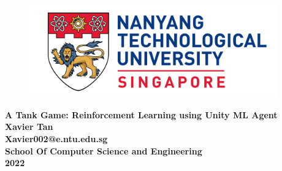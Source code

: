 \begin{titlepage}
\begin{figure}[!t]
\centering
\includegraphics[width = 4.2in]{Title/logo.png}
\caption*{}
\end{figure}

\centering
\LARGE{\textbf{A Tank Game: Reinforcement Learning using Unity ML Agent }}\\[2.5in]

\large{\textbf{Xavier Tan}}\\
\large{\textbf{Xavier002@e.ntu.edu.sg}}\\[1in]

\textbf{School Of Computer Science and Engineering}\\[0.5in]

\textbf{2022}
\newpage
\end{titlepage}